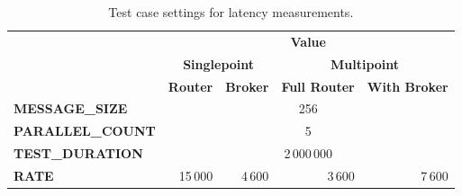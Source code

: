\begingroup
\setlength{\tabcolsep}{10pt} %
\renewcommand{\arraystretch}{1.35} %
	\begin{table}[H]
	\centering
	\caption{Test case settings for latency measurements.}
	\label{tab:test_case_latency}
	\begin{tabular}{|l|r|r|r|r|}
	\hline
	\rowcolor[HTML]{C5E3DF}
	\cellcolor[HTML]{C5E3DF}                                         & \multicolumn{4}{c|}{\cellcolor[HTML]{C5E3DF}\textbf{Value}}                                                                          \\ \cline{2-5}
	\rowcolor[HTML]{C5E3DF}
	\cellcolor[HTML]{C5E3DF}                                         & \multicolumn{2}{c|}{\cellcolor[HTML]{C5E3DF}\textbf{Singlepoint}} & \multicolumn{2}{c|}{\cellcolor[HTML]{C5E3DF}\textbf{Multipoint}} \\ \cline{2-5}
	\rowcolor[HTML]{C5E3DF}
	\multirow{-3}{*}{\cellcolor[HTML]{C5E3DF}\textbf{Test Property}} & \textbf{Router}                            & \textbf{Broker}      & \textbf{Full Router}            & \textbf{With Broker}           \\ \hline
	\textbf{MESSAGE\_SIZE}                                           & \multicolumn{4}{c|}{256}                                                                                                             \\ \hline
	\textbf{PARALLEL\_COUNT}                                         & \multicolumn{4}{c|}{5}                                                                                                               \\ \hline
	\textbf{TEST\_DURATION}                                          & \multicolumn{4}{c|}{2\,000\,000}                                                                                                         \\ \hline
	\textbf{RATE}                                                    & \cellcolor[HTML]{FFFFFF}15\,000      & 4\,600                    & 3\,600                    & 7\,600                   \\ \hline
	\end{tabular}
	\end{table}
\endgroup

